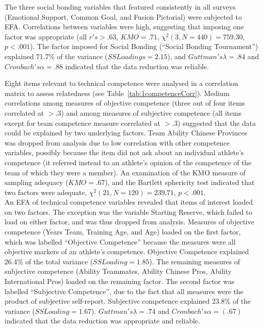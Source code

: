 \begin{CJK}{UTF8}{gbsn}
The three social bonding variables that featured consistently in all surveys (Emotional Support, Common Goal, and Fusion Pictorial) were subjected to EFA.  Correlations between variables were high, suggesting that imposing one factor was appropriate (all $r's > .63$, $KMO = .71$, $\chi^2(3, N = 440) =  759.30$, $p < .001$).  The factor imposed for Social Bonding (``Social Bonding Tournament'') explained 71.7\% of the variance ($SS Loadings =  2.15$), and $Guttman's \lambda =.84$ and $Cronbach's \alpha= .88$ indicated that the data reduction was reliable.


Eight items relevant to technical competence were analysed in a correlation matrix to assess relatedness (see Table~\ref{tab:1competenceCorr}). Medium correlations among measures of objective competence (three out of four items correlated at $> .3$) and among measures of subjective competence (all items except for team competence measure correlated at $> .3$) suggested that the data could be explained by two underlying factors. Team Ability Chinese Provinces was dropped from analysis due to low correlation with other competence variables, possibly because the item did not ask about an individual athlete's competence (it referred instead to an athlete's opinion of the competence of the team of which they were a member). An examination of the KMO measure of sampling adequacy ($KMO = .67$), and the Bartlett sphericity test indicated that two factors were adequate, $\chi^2(21, N = 120) = 239.71$, $p < .001$. \\

An EFA of technical competence variables revealed that items of interest loaded on two factors. The exception was the variable Starting Reserve, which failed to load on either factor, and was thus dropped from analysis. Measures of objective competence (Years Team, Training Age, and Age) loaded on the first factor, which was labelled ``Objective Competence'' because the measures were all objective markers of an athlete's competence.  Objective Competence explained 26.4\% of the total variance ($SS Loading = 1.85$). The remaining measures of subjective competence (Ability Teammates, Ability Chinese Pros, Ability International Pros) loaded on the remaining factor.  The second factor was labelled ``Subjective Competence'', due to the fact that all measures were the product of subjective self-report.  Subjective competence explained 23.8\% of the variance ($SS Loading = 1.67$). $Guttman's \lambda =.74$ and $Cronbach's \alpha = (.67)$ indicated that the data reduction was appropriate and reliable.


\end{CJK}
